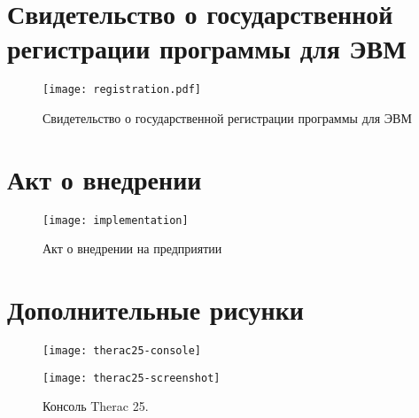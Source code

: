 \chapter{Свидетельство о государственной регистрации программы для ЭВМ}\label{app:sec:registration}
\begin{center}
    \begin{figure}[hb]
        \texttt{[image: registration.pdf]}
        \caption[Свидетельство о государственной регистрации]
            {Свидетельство о государственной регистрации программы для ЭВМ}\label{app:fig:registration}
    \end{figure}
\end{center}



\chapter{Акт о внедрении}\label{app:sec:implementation}
\begin{center}
    \begin{figure}[hb]
        \texttt{[image: implementation]}
        \caption[Акт о внедрении]{Акт о внедрении на предприятии \leadingOrganizationTitle}\label{app:fig:implementation}
    \end{figure}
\end{center}

\chapter{Дополнительные рисунки}\label{app:sec:figures}
\begin{center}
    \begin{figure}[hb!]
        \texttt{[image: therac25-console]}
        \caption[Therac 25]{Therac 25. Консоль оператора показана на рисунке \ref{app:fig:therac25_console}.}\label{app:fig:therac25}
        \texttt{[image: therac25-screenshot]}
        \caption[Консоль Therac 25]{Консоль Therac 25.}\label{app:fig:therac25_console}
    \end{figure}
\end{center}
